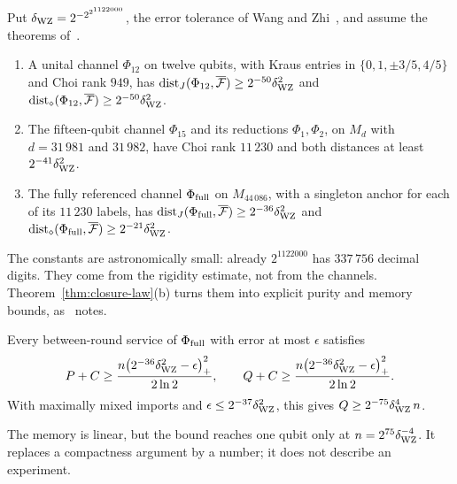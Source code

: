 \begin{proposition}\label{prop:rational-distances}
Put $\delta_{\rm WZ}=2^{-2^{2^{1122000}}}$, the error tolerance of Wang and
Zhi~\cite[(2.20)]{WangZhi2026}, and assume the theorems of~\cite{WangZhi2026}.
\begin{enumerate}[label=(\alph*),itemsep=1pt]
\item A unital channel $\Phi_{12}$ on twelve qubits, with Kraus entries in $\{0,1,\pm3/5,4/5\}$ and
Choi rank $949$, has $\operatorname{dist}_J(\Phi_{12},\overline{\mathcal F})\ge2^{-50}\delta_{\rm WZ}^2$
and $\operatorname{dist}_\diamond(\Phi_{12},\overline{\mathcal F})\ge2^{-50}\delta_{\rm WZ}^2$.
\item The fifteen-qubit channel $\Phi_{15}$ and its reductions $\Phi_1,\Phi_2$, on $M_d$ with
$d=31\,981$ and $31\,982$, have Choi rank $11\,230$ and both distances at least
$2^{-41}\delta_{\rm WZ}^2$.
\item The fully referenced channel $\Phi_{\rm full}$ on $M_{44\,086}$, with a singleton anchor for
each of its $11\,230$ labels, has
$\operatorname{dist}_J(\Phi_{\rm full},\overline{\mathcal F})\ge2^{-36}\delta_{\rm WZ}^2$ and
$\operatorname{dist}_\diamond(\Phi_{\rm full},\overline{\mathcal F})\ge2^{-21}\delta_{\rm WZ}^2$.
\end{enumerate}
\end{proposition}

The constants are astronomically small: already $2^{1122000}$ has $337\,756$ decimal digits. They
come from the rigidity estimate, not from the channels. Theorem~\ref{thm:closure-law}(b) turns them
into explicit purity and memory bounds, as~\cite[Section~6]{MghirbiDouglasD} notes.

\begin{corollary}\label{cor:rational-memory}
Every between-round service of $\Phi_{\rm full}$ with error at most $\epsilon$ satisfies
\[
 P+C\ge\frac{n\bigl(2^{-36}\delta_{\rm WZ}^2-\epsilon\bigr)_+^2}{2\ln2},\qquad
 Q+C\ge\frac{n\bigl(2^{-36}\delta_{\rm WZ}^2-\epsilon\bigr)_+^2}{2\ln2}.
\]
With maximally mixed imports and $\epsilon\le2^{-37}\delta_{\rm WZ}^2$, this gives
$Q\ge2^{-75}\delta_{\rm WZ}^4\,n$.
\end{corollary}

The memory is linear, but the bound reaches one qubit only at $n=2^{75}\delta_{\rm WZ}^{-4}$. It
replaces a compactness argument by a number; it does not describe an experiment.

